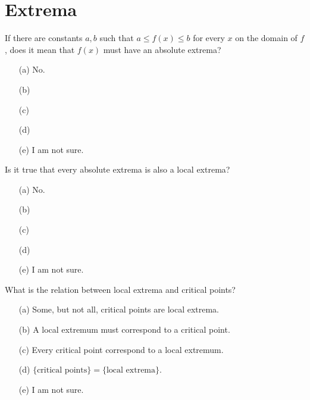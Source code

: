 \documentclass[14pt]{beamer}
\begin{document}
\section{Extrema}

\begin{frame}[t]
  If there are constants \(a,b\) such that \(a \le f(x) \le b\) for every \(x\) on the domain of \(f\), does it mean that \(f(x)\) must have an absolute extrema?

  \medskip
  \begin{itemize} \setlength\itemsep{2ex}
    \item[(a)] No.
    \item[(b)]  
    \item[(c)] 
    \item[(d)] 
    \item[(e)] I am not sure.
  \end{itemize} 
\end{frame}


\begin{frame}[t]
  Is it true that every absolute extrema is also a local extrema?

  \medskip
  \begin{itemize} \setlength\itemsep{2ex}
    \item[(a)] No.
    \item[(b)]  
    \item[(c)] 
    \item[(d)] 
    \item[(e)] I am not sure.
  \end{itemize} 
\end{frame}

\begin{frame}[t]
  What is the relation between local extrema and critical points?

  \medskip
  \begin{itemize} \setlength\itemsep{1ex}
    \item[(a)] Some, but not all, critical points are local extrema.
    \item[(b)] A local extremum must correspond to a critical point.
    \item[(c)] Every critical point correspond to a local extremum.
    \item[(d)] \(\{ \text{critical points} \} = \{ \text{local extrema} \}\).
    \item[(e)] I am not sure.
  \end{itemize} 
\end{frame}
\end{document}
